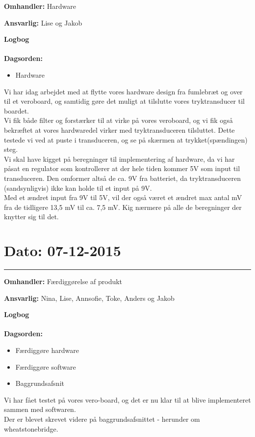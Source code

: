 \textbf{Omhandler:} Hardware

\textbf{Ansvarlig:} Lise og Jakob

\textbf{Logbog}
\\
\\
\textbf{Dagsorden:}
\begin{itemize}
	\item Hardware
\end{itemize}

Vi har idag arbejdet med at flytte vores hardware design fra fumlebræt og over til et veroboard, og samtidig gøre det muligt at tilslutte vores tryktransducer til boardet.\\ 
Vi fik både filter og forstærker til at virke på vores veroboard, og vi fik også bekræftet at vores hardwaredel virker med tryktransduceren tilsluttet. Dette testede vi ved at puste i transduceren, og se på skærmen at trykket(spændingen) steg.	\\
Vi skal have kigget på beregninger til implementering af hardware, da vi har påsat en regulator som kontrollerer at der hele tiden kommer 5V som input til transduceren. Den omformer altså de ca. 9V fra batteriet, da tryktransduceren (sandsynligvis) ikke kan holde til et input på 9V.\\
Med et ændret input fra 9V til 5V, vil der også været et ændret max antal mV fra de tidligere 13,5 mV til ca. 7,5 mV. Kig nærmere på alle de beregninger der knytter sig til det.


	
	
\section{Dato: 07-12-2015 }
\hrule

\textbf{Omhandler:} Færdiggørelse af produkt

\textbf{Ansvarlig:} Nina, Lise, Annsofie, Toke, Anders og Jakob

\textbf{Logbog}
\\
\\
\textbf{Dagsorden:}
\begin{itemize}
	\item Færdiggøre hardware
	\item Færdiggøre software
	\item Baggrundsafsnit
\end{itemize}

Vi har fået testet på vores vero-board, og det er nu klar til at blive implementeret sammen med softwaren. \\
Der er blevet skrevet videre på baggrundsafsnittet - herunder om wheatstonebridge.


